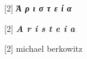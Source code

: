 \documentclass{article}
\newlength{\drop}
\newenvironment{greekpar}           %
    {\greekfont}{}
\begin{document}
    \begin{titlepage}


        \textheight
        \centering

        \hspace{2em}
        \vfill
        {
            \scalebox{1}[2]
            {\fontsize{2.5cm}{1em}\selectfont \textit{\textbf{
                \begin{greekpar}
                  Ἀ ρ ι σ τ ε ί α
                \end{greekpar}
                }}}
        }

        \vspace*{1\baselineskip}

        {
            \scalebox{1}[2]
            {\fontsize{1.1cm}{1em}\textit{\textbf{
                  A r i s t e i a
              }}}
        }
        \vspace*{.5\baselineskip}


        {
          \begin{center}
            \scalebox{1}[2]
            {\fontsize{.75cm}{1em}\selectfont \hspace{10em} michael \hspace{1pt} berkowitz \hspace{1pt}}
          \end{center}
        }



\end{titlepage}
\end{document}
